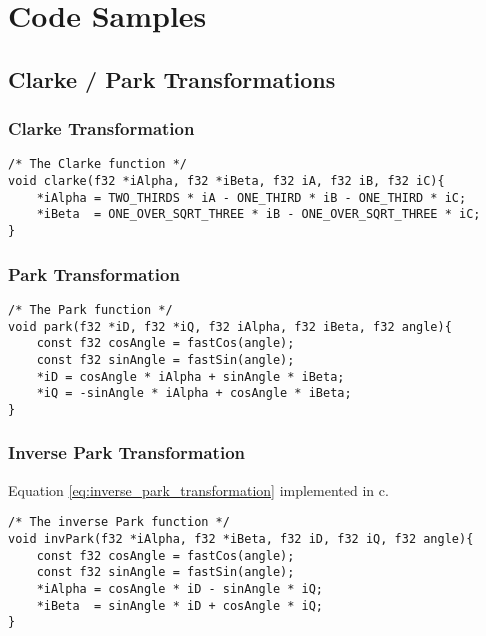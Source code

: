 \section{Code Samples}
\label{app:code_samples}
\subsection{Clarke / Park Transformations}
\subsubsection{Clarke Transformation}
\label{app:clark}


\begin{lstlisting}[style=c, caption=Embedded Clarke Transformation., label=app:code:clarke]
/* The Clarke function */
void clarke(f32 *iAlpha, f32 *iBeta, f32 iA, f32 iB, f32 iC){
	*iAlpha = TWO_THIRDS * iA - ONE_THIRD * iB - ONE_THIRD * iC;
	*iBeta  = ONE_OVER_SQRT_THREE * iB - ONE_OVER_SQRT_THREE * iC;
}
\end{lstlisting}

\subsubsection{Park Transformation}
\label{app:park}

\begin{lstlisting}[style=c, caption=Embedded Park Transformation., label=app:code:park]
/* The Park function */
void park(f32 *iD, f32 *iQ, f32 iAlpha, f32 iBeta, f32 angle){
	const f32 cosAngle = fastCos(angle);
	const f32 sinAngle = fastSin(angle);
	*iD = cosAngle * iAlpha + sinAngle * iBeta;
	*iQ = -sinAngle * iAlpha + cosAngle * iBeta;
}
\end{lstlisting}


\subsubsection{Inverse Park Transformation}
\label{app:inverse_park}
Equation \ref{eq:inverse_park_transformation} implemented in c.

\begin{lstlisting}[style=c, caption=Embedded Inverse Park Transformation., label=app:code:inverse_park]
/* The inverse Park function */
void invPark(f32 *iAlpha, f32 *iBeta, f32 iD, f32 iQ, f32 angle){
	const f32 cosAngle = fastCos(angle);
	const f32 sinAngle = fastSin(angle);
	*iAlpha = cosAngle * iD - sinAngle * iQ;
	*iBeta  = sinAngle * iD + cosAngle * iQ;
}
\end{lstlisting}



